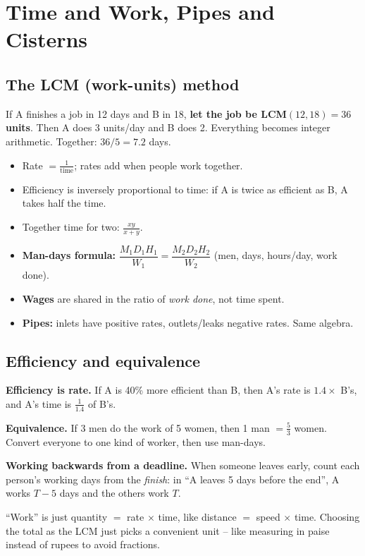 \documentclass[11pt,a4paper,openany]{report}
\begin{document}
\chapter{Time and Work, Pipes and Cisterns}\label{ch:work}

\section{The LCM (work-units) method}
If A finishes a job in 12 days and B in 18, \textbf{let the job be LCM$(12,18)=36$ units}. Then A does 3 units/day
and B does 2. Everything becomes integer arithmetic. Together: $36/5=7.2$ days.

\begin{idea}
\begin{itemize}[nosep]
\item Rate $=\frac1{\text{time}}$; rates add when people work together.
\item Efficiency is inversely proportional to time: if A is twice as efficient as B, A takes half the time.
\item Together time for two: $\frac{xy}{x+y}$.
\item \textbf{Man-days formula:} $\dfrac{M_1D_1H_1}{W_1}=\dfrac{M_2D_2H_2}{W_2}$ (men, days, hours/day, work done).
\item \textbf{Wages} are shared in the ratio of \emph{work done}, not time spent.
\item \textbf{Pipes:} inlets have positive rates, outlets/leaks negative rates. Same algebra.
\end{itemize}
\end{idea}

\section{Efficiency and equivalence}
\textbf{Efficiency is rate.} If A is 40\% more efficient than B, then A's rate is $1.4\times$ B's, and A's time is $\frac1{1.4}$ of B's.

\textbf{Equivalence.} If 3 men do the work of 5 women, then 1 man $=\frac53$ women. Convert everyone to one kind of worker, then use man-days.

\textbf{Working backwards from a deadline.} When someone leaves early, count each person's working days from the \emph{finish}: in ``A leaves 5 days before the end'', A works $T-5$ days and the others work $T$.
\begin{why}
``Work'' is just quantity $=$ rate $\times$ time, like distance $=$ speed $\times$ time. Choosing the total as the LCM
just picks a convenient unit -- like measuring in paise instead of rupees to avoid fractions.
\end{why}
\end{document}
